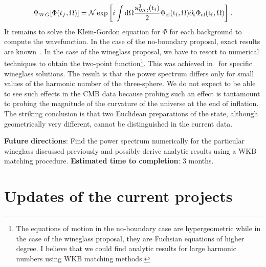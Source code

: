 \documentclass[a4paper]{article}
\begin{document}
\begin{equation}\label{eq:Wineglass}
    \Psi_{WG}[\Phi(t_f,\Omega)]=\mathcal{N}\exp\left[i\int \rm{d} \Omega \frac{a_{WG}^3(t_f)}{2}\Phi_{\rm cl}(t_f,\Omega) \partial_t\Phi_{\rm cl}(t_f,\Omega)\right]\,.
\end{equation}
It remains to solve the Klein-Gordon equation for $\Phi$ for each background to compute the wavefunction. In the case of the no-boundary proposal, exact results are known~\cite{Lehners_2023,maldacena2024commentsboundarywavefunctionslow}. In the case of the wineglass proposal, we have to resort to numerical techniques to obtain the two-point function\footnote{The equations of motion in the no-boundary case are hypergeometric while in the case of the wineglass proposal, they are Fuchsian equations of higher degree. I believe that we could find analytic results for large harmonic numbers using WKB matching methods.}. This was achieved in~\cite{Lavrelashvili:2026nib} for specific wineglass solutions. The result is that the power spectrum differs only for small values of the harmonic number of the three-sphere. We do not expect to be able to see such effects in the CMB data because probing such an effect is tantamount to probing the magnitude of the curvature of the universe at the end of inflation. The striking conclusion is that two Euclidean preparations of the state, although geometrically very different, cannot be distinguished in the current data.

\textbf{Future directions}: Find the power spectrum numerically for the particular wineglass discussed previously and possibly derive analytic results using a WKB matching procedure.
\textbf{Estimated time to completion}: 3 months.

\section{Updates of the current projects}\label{sec:updates}
\end{document}
